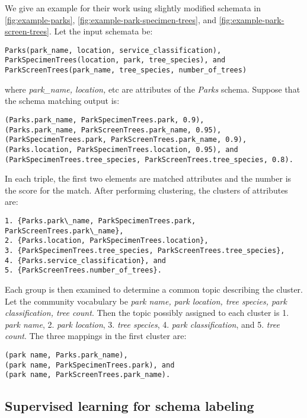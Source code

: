 We give an example for their work using slightly modified schemata in \autoref{fig:example-parks}, \autoref{fig:example-park-specimen-trees}, and \autoref{fig:example-park-screen-trees}. Let the input schemata be:

\begin{lstlisting}
Parks(park_name, location, service_classification),
ParkSpecimenTrees(location, park, tree_species), and
ParkScreenTrees(park_name, tree_species, number_of_trees)
\end{lstlisting}

where \textit{park\_name, location,} etc are attributes of the \textit{Parks} schema. Suppose that the schema matching output is:

\begin{lstlisting}
(Parks.park_name, ParkSpecimenTrees.park, 0.9),
(Parks.park_name, ParkScreenTrees.park_name, 0.95),
(ParkSpecimenTrees.park, ParkScreenTrees.park_name, 0.9),
(Parks.location, ParkSpecimenTrees.location, 0.95), and
(ParkSpecimenTrees.tree_species, ParkScreenTrees.tree_species, 0.8).
\end{lstlisting}

In each triple, the first two elements are matched attributes and the number is the score for the match. After performing clustering, the clusters of attributes are:
\begin{lstlisting}
1. {Parks.park\_name, ParkSpecimenTrees.park, ParkScreenTrees.park\_name},
2. {Parks.location, ParkSpecimenTrees.location},
3. {ParkSpecimenTrees.tree_species, ParkScreenTrees.tree_species},
4. {Parks.service_classification}, and
5. {ParkScreenTrees.number_of_trees}.
\end{lstlisting}

Each group is then examined to determine a common topic describing the cluster. Let the community vocabulary be \textit{{park name, park location, tree species, park classification, tree count}}. Then the topic possibly assigned to each cluster is {1. \textit{park name}, 2. \textit{park location}, 3. \textit{tree species}, 4. \textit{park classification}, and 5. \textit{tree count}}. The three mappings in the first cluster are:
\begin{lstlisting}
(park name, Parks.park_name),
(park name, ParkSpecimenTrees.park), and
(park name, ParkScreenTrees.park_name).
\end{lstlisting}

\subsection{Supervised learning for schema labeling}
\label{ssec:SupervisedLearningForSchemaLabeling}

